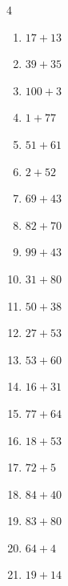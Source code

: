 \begin{multicols}{4}
\begin{enumerate}
  \item $17+13$
        \phantom{$=30$}

  \item $39+35$
        \phantom{$=74$}

  \item $100+3$
        \phantom{$=103$}

  \item $1+77$
        \phantom{$=78$}

  \item $51+61$
        \phantom{$=112$}

  \item $2+52$
        \phantom{$=54$}

  \item $69+43$
        \phantom{$=112$}

  \item $82+70$
        \phantom{$=152$}

  \item $99+43$
        \phantom{$=142$}

  \item $31+80$
        \phantom{$=111$}

  \item $50+38$
        \phantom{$=88$}

  \item $27+53$
        \phantom{$=80$}

  \item $53+60$
        \phantom{$=113$}

  \item $16+31$
        \phantom{$=47$}

  \item $77+64$
        \phantom{$=141$}

  \item $18+53$
        \phantom{$=71$}

  \item $72+5$
        \phantom{$=77$}

  \item $84+40$
        \phantom{$=124$}

  \item $83+80$
        \phantom{$=163$}

  \item $64+4$
        \phantom{$=68$}

\columnbreak %

\resetques

  \item $19+14$
        \phantom{$=33$}


\end{enumerate}
\end{multicols}
